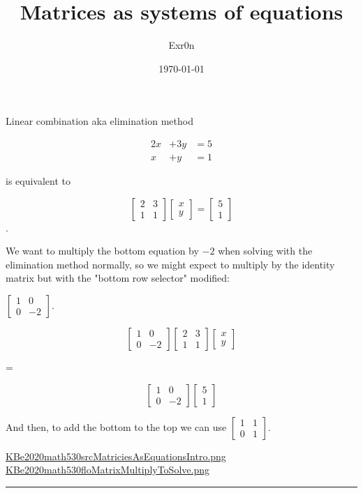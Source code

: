 \documentclass[letterpaper]{article}
\author{Exr0n}
\date{\today}
\title{Matrices as systems of equations}
\renewcommand{\tableofcontents}{}
\begin{document}
\tableofcontents

Linear combination aka elimination method

\begin{align}
2x &+ 3y &= 5 \\
 x &+  y &= 1
\end{align}

is equivalent to

\[
\left[\begin{matrix}
2 &3 \\
1 &1
\end{matrix}\right]
\left[\begin{matrix}x\\y\end{matrix}\right]
=
\left[\begin{matrix}5\\1\end{matrix}\right]
\].

We want to multiply the bottom equation by \(-2\) when solving with the
elimination method normally, so we might expect to multiply by the
identity matrix but with the "bottom row selector" modified:

\(\left[\begin{matrix}1&0\\0&-2\end{matrix}\right]\).

\[
\left[\begin{matrix} 1 &0 \\ 0 &-2\end{matrix}\right]
\left[\begin{matrix} 2 &3 \\ 1 &1 \end{matrix}\right]
\left[\begin{matrix} x \\ y \end{matrix}\right]
\]

=

\[
\left[\begin{matrix} 1 &0 \\ 0 &-2\end{matrix}\right]
\left[\begin{matrix} 5 \\ 1\end{matrix}\right]
\]

And then, to add the bottom to the top we can use
\(\left[\begin{matrix}1&1\\0&1\end{matrix}\right]\).

\href{KBe2020math530srcMatriciesAsEquationsIntro.png.org}{KBe2020math530srcMatriciesAsEquationsIntro.png}
\href{KBe2020math530floMatrixMultiplyToSolve.png.org}{KBe2020math530floMatrixMultiplyToSolve.png}

\noindent\rule{\textwidth}{0.5pt}
\end{document}
